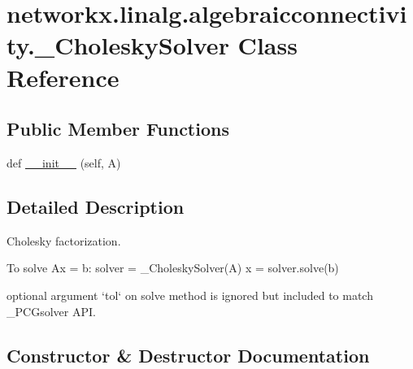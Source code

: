 \hypertarget{classnetworkx_1_1linalg_1_1algebraicconnectivity_1_1__CholeskySolver}{}\section{networkx.\+linalg.\+algebraicconnectivity.\+\_\+\+Cholesky\+Solver Class Reference}
\label{classnetworkx_1_1linalg_1_1algebraicconnectivity_1_1__CholeskySolver}
\subsection*{Public Member Functions}
\begin{DoxyCompactItemize}
\item 
def \hyperlink{classnetworkx_1_1linalg_1_1algebraicconnectivity_1_1__CholeskySolver_a5d32a10f769065300c4fe2e1ee8061a6}{\+\_\+\+\_\+init\+\_\+\+\_\+} (self, A)
\end{DoxyCompactItemize}


\subsection{Detailed Description}
\begin{DoxyVerb}Cholesky factorization.

To solve Ax = b:
    solver = _CholeskySolver(A)
    x = solver.solve(b)

optional argument `tol` on solve method is ignored but included
to match _PCGsolver API.
\end{DoxyVerb}
 

\subsection{Constructor \& Destructor Documentation}
\mbox{\label{classnetworkx_1_1linalg_1_1algebraicconnectivity_1_1__CholeskySolver_a5d32a10f769065300c4fe2e1ee8061a6}} 
